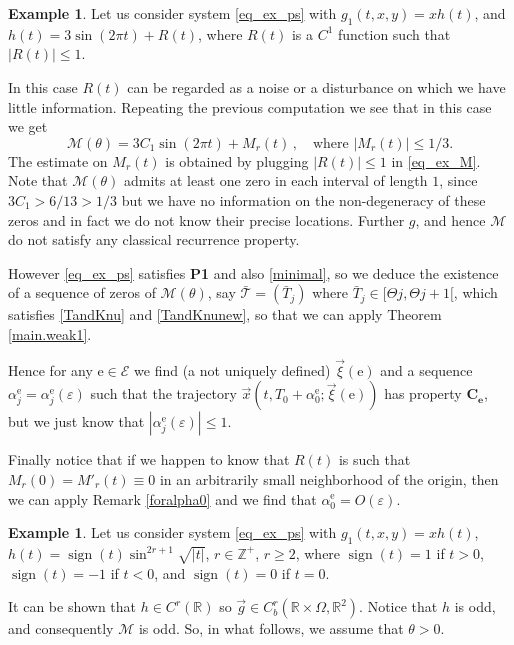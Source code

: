 \documentclass[10pt]{article}
\numberwithin{equation}{section}
\def\al{\alpha}
\def\ep{\varepsilon}
\def\Om{\Omega}
\def\Z{{\mathbb Z}}
\def\R{{\mathbb R}}
\def\ee{{\mathrm e}}
\def\EE{{\mathcal E}}
\def\MM{{\mathcal M}}
\def\TT{{\mathcal T}}
\def\xxi{\vec{\xi}}
\def\x{\vec{x}}
\def\g{\vec{g}}
\DeclareMathOperator{\sign}{sign}
\def\ogap{\Theta}   %
\def\aaa{\theta}
\newcommand\assump[1]{{\rm\textbf{#1}}}
\theoremstyle{definition}
\newtheorem{example}[theorem]{Example}
\theoremstyle{remark}
\begin{document}
\begin{example}\label{exgen0}
	Let us consider system \eqref{eq_ex_ps} with $g_1(t,x,y)=x h(t)$, and  $h(t)=3 \sin (2 \pi t) +R(t)$,
where $R(t)$ is a $C^1$ function such that $|R(t)| \le 1$.
\end{example}
In this case $R(t)$ can be regarded as a noise or a disturbance on which we have little information.
Repeating the previous computation we see that  in this case we get
$$\MM(\aaa)=3 C_1 \sin (2 \pi t) +M_r(t)\, , \quad \textrm{where $|M_r(t)| \le  1/3$}.$$
The estimate on $M_r(t)$ is obtained by plugging $|R(t)|\le 1$ in \eqref{eq_ex_M}.
Note that $\MM(\aaa)$ admits at least one zero in each interval of length $1$,  since $3C_1>6/13>1/3$  but we have no information on the
non-degeneracy of these zeros and in fact we do not know their precise locations.
Further $g$,  and hence $\MM$ do not satisfy any classical recurrence property.

However \eqref{eq_ex_ps} satisfies \assump{P1}  and also \eqref{minimal}, so we deduce the existence of a sequence
of zeros of $\MM(\aaa)$, say
$\bar{\TT}=(\bar{T}_j)$ where $\bar{T}_j \in [\ogap j , \ogap j +1[$, which satisfies \eqref{TandKnu} and \eqref{TandKnunew},
 so that we can apply Theorem \ref{main.weak1}.

Hence for any $\ee \in \EE$ we find (a not uniquely defined)   $\xxi(\ee)$ and a sequence $\al_j^{\ee}=\al_j^{\ee}(\ep)$ such that the
trajectory
$\x(t,T_0 +\al_0^{\ee}; \xxi(\ee))$
has property $\mathbf{C_e}$, but we just know that $|\al_j^{\ee}(\ep)| \le 1$.



Finally notice that   if we happen to know that $R(t)$ is such that $M_r(0)=M'_r(t) \equiv 0$ in an arbitrarily small
neighborhood of the origin, then we can apply Remark \ref{foralpha0} and we find that  $\al_0^{\ee}=O(\ep)$.



\begin{example}\label{exgen}
Let us consider system \eqref{eq_ex_ps} with $g_1(t,x,y)= x h(t)$, $h(t)= \sign(t)\sin^{2r+1}\sqrt{|t|}$, $r\in\Z^+$, $r\geq 2$,
where $\sign(t)=1$ if $t>0$, $\sign(t)=-1$ if $t<0$, and $\sign(t)=0$ if $t=0$.
\end{example}

It can be shown that $h\in C^r(\R)$ so $\g\in C^r_b(\R\times \Om,\R^2)$.
Notice that $h$ is odd, and consequently $\mathcal{M}$ is odd. So, in what follows, we assume that $\aaa>0$.
\end{document}
